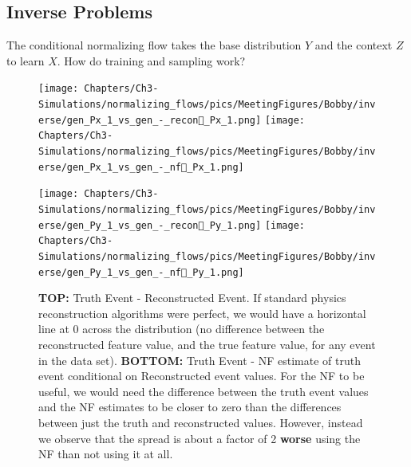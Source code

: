 \subsection{Inverse Problems}

    The conditional normalizing flow takes the base distribution $Y$ and the context $Z$ to learn $X$. How do training and sampling work? 
    
   
    
    
    
    
    \begin{figure}[H]
        \centering
        \begin{minipage}{.5\textwidth}
        
            \centering
            
            \texttt{[image: Chapters/Ch3-Simulations/normalizing\_flows/pics/MeetingFigures/Bobby/inverse/gen\_Px\_1\_vs\_gen\_-\_recon\_Px\_1.png]}
            \texttt{[image: Chapters/Ch3-Simulations/normalizing\_flows/pics/MeetingFigures/Bobby/inverse/gen\_Px\_1\_vs\_gen\_-\_nf\_Px\_1.png]}
    
        \end{minipage}%
        \begin{minipage}{.5\textwidth}
        
            \centering
            
            \texttt{[image: Chapters/Ch3-Simulations/normalizing\_flows/pics/MeetingFigures/Bobby/inverse/gen\_Py\_1\_vs\_gen\_-\_recon\_Py\_1.png]}
            \texttt{[image: Chapters/Ch3-Simulations/normalizing\_flows/pics/MeetingFigures/Bobby/inverse/gen\_Py\_1\_vs\_gen\_-\_nf\_Py\_1.png]}
    
        \end{minipage}%
        \caption[Placeholder Short text]{\textbf{TOP:} Truth Event - Reconstructed Event. If standard physics reconstruction algorithms were perfect, we would have a horizontal line at 0 across the distribution (no difference between the reconstructed feature value, and the true feature value, for any event in the data set). \textbf{BOTTOM:} Truth Event - NF estimate of truth event conditional on Reconstructed event values. For the NF to be useful, we would need the difference between the truth event values and the NF estimates to be closer to zero than the differences between just the truth and reconstructed values. However, instead we observe that the spread is about a factor of 2 \textbf{worse} using the NF than not using it at all. }
        \label{fig:16features6}
    \end{figure}
    
